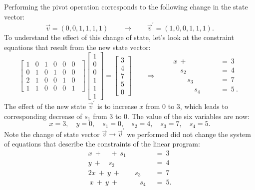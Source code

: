 \documentclass[11pt,oneside]{article}
\begin{document}
		Performing the pivot operation corresponds to the following change in the state vector:
		\[
		   \vec{v} = (0,0, 1, 1, 1, 1 )
		   \qquad  \to 
		   \qquad 
		   \vec{v}^{\prime} = (1,0, 0, 1, 1, 1 ).
		\]
		To understand the effect of this change of state,
		let's look at the constraint equations that result from the new state vector:
		{\footnotesize
		\[
			\left[
			\begin{array}{rrrrrr}
				    1&     0& 1& 0& 0& 0     \  \   \\ 
				    0&     1& 0& 1& 0& 0     \  \   \\ 
				    2&     1& 0& 0& 1& 0     \  \   \\ 
				    1&     1& 0& 0& 0& 1       \  \ 
			\end{array}
			\right]	
			\!\!
			\begin{bmatrix}
				1 \\ 0 \\  0 \\ 1 \\ 1 \\ 1 
			\end{bmatrix}
			=
			\begin{bmatrix}
				3 \\ 4 \\  7 \\ 5 \\ 0 
			\end{bmatrix}			
			\qquad	
			\Rightarrow
			\qquad
			\begin{array}{rl}
					x \ + \ \ \  \quad \quad \quad	\ &=	\ 3	\\
					\quad s_2 \quad \quad 		\ &= 	\ 4	\\
					\quad \quad  s_3 \quad 		\ &= 	\ 7	\\
					 \quad \quad \quad  s_4   		\ &= 	\ 5 \ .
			\end{array}
		\]}%
		The effect of the new state $\vec{v}^\prime$ is to increase $x$ from $0$ to $3$,
		which leads to corresponding decrease of $s_1$ from $3$ to $0$.
		The value of the six variables are now:
		\[
			x=3, \quad y=0, \quad s_1=0, \quad s_2=4,  \quad s_3=7, \quad s_4=5.
		\]
		Note the change of state vector $\vec{v} \to \vec{v}^\prime$ we performed did not change the 
		system of equations that describe the constraints of the linear program:
		\[		
			\begin{array}{rl}
					x \ + \ \ \ \ \ + \ s_1 \quad \quad \quad	\ &=	\ 3	\\
					          y \ + \quad s_2 \quad \quad 		\ &= 	\ 4	\\
					2x \ + \ y \ + \quad \quad  s_3 \quad 		\ &= 	\ 7	\\
					 \ x \ + \ y \ + \quad \quad \quad  s_4   		\ &= 	\ 5.	
			\end{array}
		\]			
\end{document}
